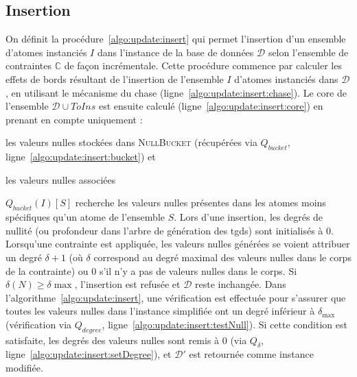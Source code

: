 \subsection{Insertion}
\label{sec:update:insert}
On définit la procédure~\ref{algo:update:insert} qui permet l'insertion d'un ensemble d'atomes instanciés $I$ dans l'instance de la base de données $\mathcal{D}$ selon l'ensemble de contraintes $\mathbb{C}$ de façon incrémentale.
Cette procédure commence par calculer les effets de bords résultant de l'insertion de l'ensemble $I$ d'atomes instanciés dans $\mathcal{D}$, en utilisant le mécanisme du \gls{chase} (ligne~\ref{algo:update:insert:chase}).
Le \gls{core} de l'ensemble $\mathcal{D} \cup ToIns$ est ensuite calculé (ligne~\ref{algo:update:insert:core}) en prenant en compte uniquement :
\begin{enumerate*}[label=(\alph*)]
    \item les valeurs nulles stockées dans \textsc{NullBucket} (récupérées via $Q_{bucket}$, ligne~\ref{algo:update:insert:bucket}) et
    \item les valeurs nulles associées
\end{enumerate*}
$Q_{bucket}(I){[S]}$ recherche les valeurs nulles présentes dans les atomes moins spécifiques qu'un atome de l'ensemble $S$.
Lors d'une insertion, les degrés de nullité (ou profondeur dans l'arbre de génération des \glspl{tgd}) sont initialisés à 0.
Lorsqu'une contrainte est appliquée, les valeurs nulles générées se voient attribuer un degré $\delta + 1$ (où $\delta$ correspond au degré maximal des valeurs nulles dans le corps de la contrainte) ou 0 s'il n'y a pas de valeurs nulles dans le corps.
Si $\delta(N) \geq \delta{\max}$, l'insertion est refusée et $\mathcal{D}$ reste inchangée.
Dans l'algorithme~\ref{algo:update:insert}, une vérification est effectuée pour s'assurer que toutes les valeurs nulles dans l'instance simplifiée ont un degré inférieur à $\delta_{\max}$ (vérification via $Q_{degree}$, ligne~\ref{algo:update:insert:testNull}).
Si cette condition est satisfaite, les degrés des valeurs nulles sont remis à 0 (via $Q_{\delta}$, ligne~\ref{algo:update:insert:setDegree}), et $\mathcal{D}'$ est retournée comme instance modifiée.

